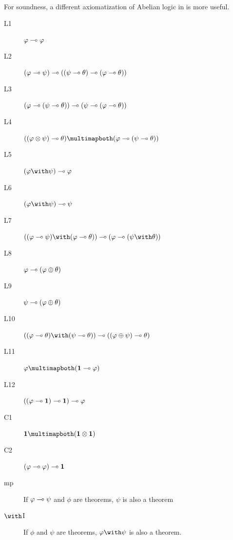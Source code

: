 For soundness, a different axiomatization of Abelian logic in
\citep{metcalfe2006} is more useful.
\begin{description}
 \item[L1] $\varphi\multimap\varphi$
 \item[L2]
      $(\varphi\multimap\psi)\multimap((\psi\multimap\theta)\multimap(\varphi\multimap\theta))$
 \item[L3]
      $(\varphi\multimap(\psi\multimap\theta))\multimap(\psi\multimap(\varphi\multimap\theta))$
 \item[L4]
      $((\phi\otimes\psi)\limp\theta)\multimapboth
      (\phi\limp(\psi\limp\theta))$
 \item[L5]
      $(\phi\with\psi)\limp\phi$
 \item[L6]
      $(\phi\with\psi)\limp\psi$
 \item[L7]
      $((\phi\limp\psi)\with(\phi\limp\theta))\limp
      (\phi\limp(\psi\with\theta))$
 \item[L8]
      $\varphi\multimap(\varphi\oplus\theta)$
 \item[L9]
      $\psi\multimap(\varphi\oplus\theta)$
 \item[L10]
      $((\phi\limp\theta)\with(\psi\limp\theta))\limp((\phi\oplus\psi)\limp\theta)$
 \item[L11]
      $\phi\multimapboth(\one\limp\phi)$
 \item[L12]
      $((\varphi\multimap\mathbf{1})\multimap\mathbf{1})\multimap\varphi$
 \item[C1] $\one\multimapboth (\one\otimes\one)$
 \item[C2] $(\varphi\multimap\varphi)\multimap\mathbf{1}$
 \item[mp]
      If $\varphi\multimap\psi$ and $\phi$ are theorems, $\psi$ is also a
      theorem
 \item[$\with$I] If $\phi$ and $\psi$ are theorems, $\phi\with\psi$ is
      also a theorem.
\end{description}

